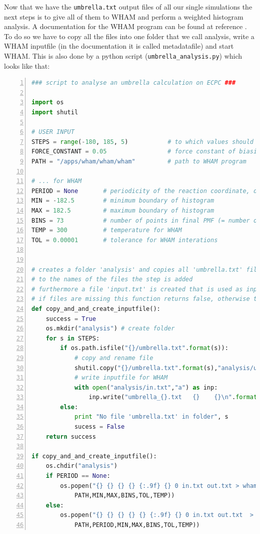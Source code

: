 \documentclass[a4paper,11pt]{scrartcl}
\begin{document}
Now that we have the \texttt{umbrella.txt} output files of all our single simulations the next steps is to give all of them to WHAM and perform a weighted histogram analysis. A documentation for the WHAM program can be found at reference \cite{grossfield_wham_nodate}. To do so we have to copy all the files into one folder that we call analysis, write a WHAM inputfile (in the documentation it is called metadatafile) and start WHAM. This is also done by a python script (\texttt{umbrella\_analysis.py}) which looks like that:
\begin{lstlisting}[frame=single,language=python,basicstyle=\footnotesize,commentstyle=\color{red},keywordstyle=\color{blue},stringstyle=\color{mygreen},numbers=left,escapechar=|]
### script to analyse an umbrella calculation on ECPC ###

import os
import shutil

# USER INPUT
STEPS = range(-180, 185, 5)           # to which values should the restraint be set? 
FORCE_CONSTANT = 0.05                 # force constant of biasing potential
PATH = "/apps/wham/wham/wham"         # path to WHAM program

# ... for WHAM
PERIOD = None       # periodicity of the reaction coordinate, description see WHAM manual |\label{wham_period}|
MIN = -182.5        # minimum boundary of histogram
MAX = 182.5         # maximum boundary of histogram
BINS = 73           # number of points in final PMF (= number of bins)
TEMP = 300          # temperature for WHAM 
TOL = 0.00001       # tolerance for WHAM interations


# creates a folder 'analysis' and copies all 'umbrella.txt' files there
# to the names of the files the step is added
# furthermore a file 'input.txt' is created that is used as input for WHAM
# if files are missing this function returns false, otherwise true
def copy_and_and_create_inputfile():
    success = True
    os.mkdir("analysis") # create folder
    for s in STEPS:
        if os.path.isfile("{}/umbrella.txt".format(s)):
            # copy and rename file
            shutil.copy("{}/umbrella.txt".format(s),"analysis/umbrella_{}.txt".format(s))
            # write inputfile for WHAM
            with open("analysis/in.txt","a") as inp:         
                inp.write("umbrella_{}.txt   {}    {}\n".format(s,float(s),FORCE_CONSTANT))
        else:
            print "No file 'umbrella.txt' in folder", s
            sucess = False
    return success

if copy_and_and_create_inputfile():
    os.chdir("analysis")
    if PERIOD == None:
        os.popen("{} {} {} {} {:.9f} {} 0 in.txt out.txt > wham_output.txt".format(   |\label{runWHAM}|
            PATH,MIN,MAX,BINS,TOL,TEMP))
    else:
        os.popen("{} {} {} {} {} {:.9f} {} 0 in.txt out.txt  > wham_output.txt".format(
            PATH,PERIOD,MIN,MAX,BINS,TOL,TEMP))

\end{lstlisting}
\end{document}
